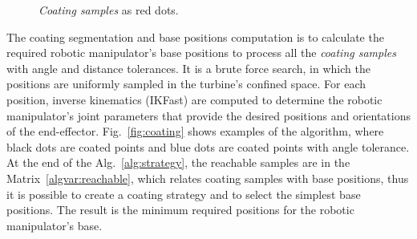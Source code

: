 \begin{figure}
	\centering
	\quad
    \caption{\textit{Coating samples} as red dots.}
    \label{fig:discretization}
\end{figure}

The coating segmentation and base positions computation is to calculate the
required robotic manipulator's base positions to process all the \textit{coating
samples} with angle and distance tolerances. It is a brute force search, in
which the positions are uniformly sampled in the turbine's confined space. For
each position, inverse kinematics (IKFast) are computed to determine the
robotic manipulator's joint parameters that provide the desired positions and
orientations of the end-effector. Fig.~\ref{fig:coating} shows examples of the
algorithm, where black dots are coated points and blue dots are coated points
with angle tolerance. At the end of the Alg.~\ref{alg:strategy}, the reachable
samples are in the Matrix~\ref{algvar:reachable}, which relates coating samples
with base positions, thus it is possible to create a coating strategy and to
select the simplest base positions. The result is the minimum required
positions for the robotic manipulator's base.

